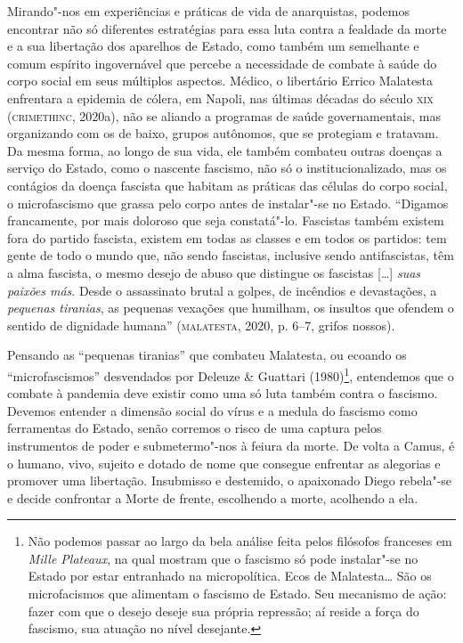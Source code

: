 Mirando"-nos em experiências e práticas de vida de anarquistas, podemos
encontrar não só diferentes estratégias para essa luta contra a fealdade
da morte e a sua libertação dos aparelhos de Estado, como também um
semelhante e comum espírito ingovernável que percebe a necessidade de
combate à saúde do corpo social em seus múltiplos aspectos. Médico, o
libertário Errico Malatesta enfrentara a epidemia de cólera, em Napoli,
nas últimas décadas do século \textsc{xix} (\textsc{crimethinc}, 2020a), não se aliando a
programas de saúde governamentais, mas organizando com os de baixo,
grupos autônomos, que se protegiam e tratavam. Da mesma forma, ao longo
de sua vida, ele também combateu outras doenças a serviço do Estado,
como o nascente fascismo, não só o institucionalizado, mas os contágios
da doença fascista que habitam as práticas das células do corpo social,
o microfascismo que grassa pelo corpo antes de instalar"-se no Estado.
``Digamos francamente, por mais doloroso que seja constatá"-lo. Fascistas
também existem fora do partido fascista, existem em todas as classes e
em todos os partidos: tem gente de todo o mundo que, não sendo
fascistas, inclusive sendo antifascistas, têm a alma fascista, o mesmo
desejo de abuso que distingue os fascistas {[}\ldots{}{]} \textit{suas
paixões más}. Desde o assassinato brutal a golpes, de incêndios e
devastações, a \textit{pequenas tiranias}, as pequenas vexações que
humilham, os insultos que ofendem o sentido de dignidade humana''
(\textsc{malatesta}, 2020, p. 6--7, grifos nossos).

Pensando as ``pequenas tiranias'' que combateu Malatesta, ou ecoando os
``microfascismos'' desvendados por Deleuze \& Guattari (1980)\footnote{Não
  podemos passar ao largo da bela análise feita pelos filósofos
  franceses em \emph{Mille Plateaux}, na qual mostram que o fascismo só
  pode instalar"-se no Estado por estar entranhado na micropolítica. Ecos
  de Malatesta\ldots{} São os microfacismos que alimentam o fascismo de
  Estado. Seu mecanismo de ação: fazer com que o desejo deseje sua
  própria repressão; aí reside a força do fascismo, sua atuação no nível
  desejante.}, entendemos que o combate à pandemia deve existir como uma
só luta também contra o fascismo. Devemos entender a dimensão social do
vírus e a medula do fascismo como ferramentas do Estado, senão corremos
o risco de uma captura pelos instrumentos de poder e submetermo"-nos à
feiura da morte. De volta a Camus, é o humano, vivo, sujeito e dotado de
nome que consegue enfrentar as alegorias e promover uma libertação.
Insubmisso e destemido, o apaixonado Diego rebela"-se e decide confrontar
a Morte de frente, escolhendo a morte, acolhendo a ela.

